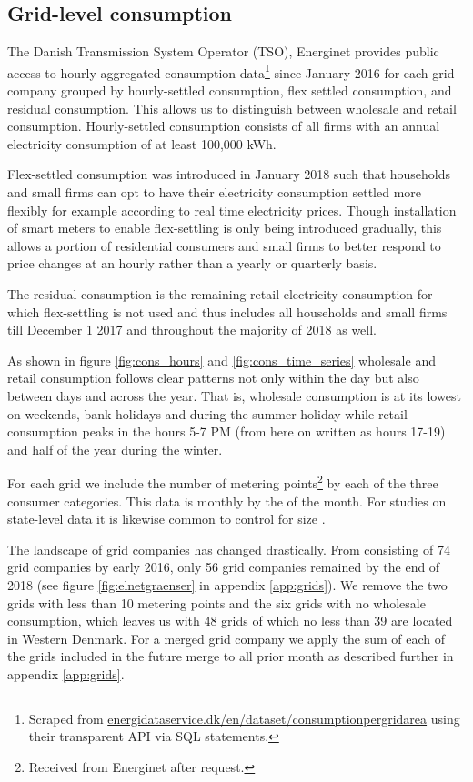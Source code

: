 \subsection{Grid-level consumption}
\label{subsec:d_consumption}
The Danish Transmission System Operator (TSO), Energinet provides public access to hourly aggregated consumption data\footnote{Scraped from \href{https://www.energidataservice.dk/en/dataset/consumptionpergridarea/}{energidataservice.dk/en/dataset/consumptionpergridarea} using their transparent API via SQL statements.} since January 2016 for each grid company grouped by hourly-settled consumption, flex settled consumption, and residual consumption. This allows us to distinguish between wholesale and retail consumption. Hourly-settled consumption consists of all firms with an annual electricity consumption of at least 100,000 kWh.
\par
Flex-settled consumption was introduced in January 2018 such that households and small firms can opt to have their electricity consumption settled more flexibly for example according to real time electricity prices. Though installation of smart meters to enable flex-settling is only being introduced gradually, this allows a portion of residential consumers and small firms to better respond to price changes at an hourly rather than a yearly or quarterly basis.
\par
The residual consumption is the remaining retail electricity consumption for which flex-settling is not used and thus includes all households and small firms till December 1 2017 and throughout the majority of 2018 as well.
\bigskip\par
As shown in figure \ref{fig:cons_hours} and \ref{fig:cons_time_series} wholesale and retail consumption follows clear patterns not only within the day but also between days and across the year. That is, wholesale consumption is at its lowest on weekends, bank holidays and during the summer holiday while retail consumption peaks in the hours 5-7 PM (from here on written as hours 17-19) and half of the year during the winter.
\bigskip\par
For each grid we include the number of metering points\footnote{Received from Energinet after request.} by each of the three consumer categories. This data is monthly by the  of the month. For studies on state-level data it is likewise common to control for size \citep{burke2017price}.
\par
The landscape of grid companies has changed drastically. From consisting of 74 grid companies by early 2016, only 56 grid companies remained by the end of 2018 (see figure \ref{fig:elnetgraenser} in appendix \ref{app:grids}). We remove the two grids with less than 10 metering points and the six grids with no wholesale consumption, which leaves us with 48 grids of which no less than 39 are located in Western Denmark. For a merged grid company we apply the sum of each of the grids included in the future merge to all prior month as described further in appendix \ref{app:grids}.
